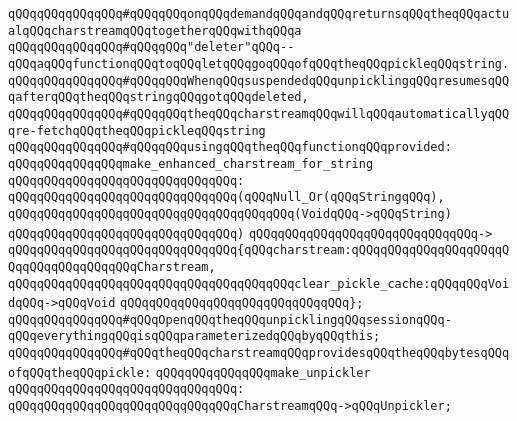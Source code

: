 \verb|qQQqqQQqqQQqqQQq#qQQqqQQqonqQQqdemandqQQqandqQQqreturnsqQQqtheqQQqactualqQQqcharstreamqQQqtogetherqQQqwithqQQqa|\newline
\verb|qQQqqQQqqQQqqQQq#qQQqqQQq"deleter"qQQq--qQQqaqQQqfunctionqQQqtoqQQqletqQQqgoqQQqofqQQqtheqQQqpickleqQQqstring.|\newline
\verb|qQQqqQQqqQQqqQQq#qQQqqQQqWhenqQQqsuspendedqQQqunpicklingqQQqresumesqQQqafterqQQqtheqQQqstringqQQqgotqQQqdeleted,|\newline
\verb|qQQqqQQqqQQqqQQq#qQQqqQQqtheqQQqcharstreamqQQqwillqQQqautomaticallyqQQqre-fetchqQQqtheqQQqpickleqQQqstring|\newline
\verb|qQQqqQQqqQQqqQQq#qQQqqQQqusingqQQqtheqQQqfunctionqQQqprovided:|\newline
\newline
\verb|qQQqqQQqqQQqqQQqmake_enhanced_charstream_for_string|\newline
\verb|qQQqqQQqqQQqqQQqqQQqqQQqqQQqqQQq:|\newline
\verb|qQQqqQQqqQQqqQQqqQQqqQQqqQQqqQQq(qQQqNull_Or(qQQqStringqQQq),|\newline
\verb|qQQqqQQqqQQqqQQqqQQqqQQqqQQqqQQqqQQqqQQq(VoidqQQq->qQQqString)|\newline
\verb|qQQqqQQqqQQqqQQqqQQqqQQqqQQqqQQq)|\newline
\verb|qQQqqQQqqQQqqQQqqQQqqQQqqQQqqQQq->|\newline
\verb|qQQqqQQqqQQqqQQqqQQqqQQqqQQqqQQq{qQQqcharstream:qQQqqQQqqQQqqQQqqQQqqQQqqQQqqQQqqQQqqQQqCharstream,|\newline
\verb|qQQqqQQqqQQqqQQqqQQqqQQqqQQqqQQqqQQqqQQqclear_pickle_cache:qQQqqQQqVoidqQQq->qQQqVoid|\newline
\verb|qQQqqQQqqQQqqQQqqQQqqQQqqQQqqQQq};|\newline
\newline
\newline
\newline
\verb|qQQqqQQqqQQqqQQq#qQQqOpenqQQqtheqQQqunpicklingqQQqsessionqQQq-qQQqeverythingqQQqisqQQqparameterizedqQQqbyqQQqthis;|\newline
\verb|qQQqqQQqqQQqqQQq#qQQqtheqQQqcharstreamqQQqprovidesqQQqtheqQQqbytesqQQqofqQQqtheqQQqpickle:|\newline
\newline
\verb|qQQqqQQqqQQqqQQqmake_unpickler|\newline
\verb|qQQqqQQqqQQqqQQqqQQqqQQqqQQqqQQq:|\newline
\verb|qQQqqQQqqQQqqQQqqQQqqQQqqQQqqQQqCharstreamqQQq->qQQqUnpickler;|\newline
